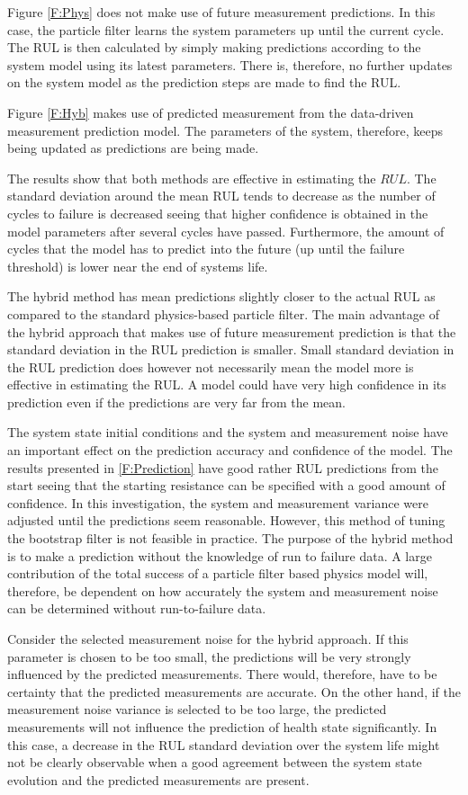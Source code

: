 Figure \ref{F:Phys} does not make use of future measurement predictions. In this case, the particle filter learns the system parameters up until the current cycle. The RUL is then calculated by simply making predictions according to the system model using its latest parameters. There is, therefore, no further updates on the system model as the prediction steps are made to find the RUL. 

Figure \ref{F:Hyb} makes use of predicted measurement from the data-driven measurement prediction model. The parameters of the system, therefore, keeps being updated as predictions are being made. 

The results show that both methods are effective in estimating the $RUL$. The standard deviation around the mean RUL tends to decrease as the number of cycles to failure is decreased seeing that higher confidence is obtained in the model parameters after several cycles have passed. Furthermore, the amount of cycles that the model has to predict into the future (up until the failure threshold) is lower near the end of systems life. 

The hybrid method has mean predictions slightly closer to the actual RUL as compared to the standard physics-based particle filter. The main advantage of the hybrid approach that makes use of future measurement prediction is that the standard deviation in the RUL prediction is smaller. Small standard deviation in the RUL prediction does however not necessarily mean the model more is effective in estimating the RUL. A model could have very high confidence in its prediction even if the predictions are very far from the mean.

The system state initial conditions and the system and measurement noise have an important effect on the prediction accuracy and confidence of the model. The results presented in \ref{F:Prediction} have good rather RUL predictions from the start seeing that the starting resistance can be specified with a good amount of confidence. In this investigation, the system and measurement variance were adjusted until the predictions seem reasonable. However, this method of tuning the bootstrap filter is not feasible in practice. The purpose of the hybrid method is to make a prediction without the knowledge of run to failure data. A large contribution of the total success of a particle filter based physics model will, therefore, be dependent on how accurately the system and measurement noise can be determined without run-to-failure data. 

Consider the selected measurement noise for the hybrid approach. If this parameter is chosen to be too small, the predictions will be very strongly influenced by the predicted measurements. There would, therefore, have to be certainty that the predicted measurements are accurate. On the other hand, if the measurement noise variance is selected to be too large, the predicted measurements will not influence the prediction of health state significantly. In this case, a decrease in the RUL standard deviation over the system life might not be clearly observable when a good agreement between the system state evolution and the predicted measurements are present.

